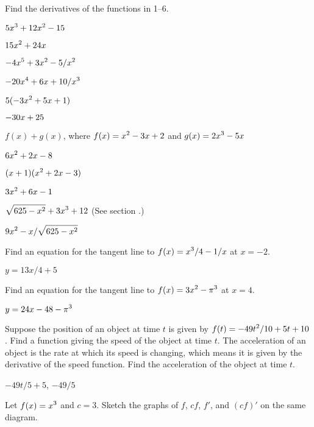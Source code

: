 \begin{exercises}

Find the derivatives of the functions in 1--6.

\exercise $\displaystyle 5x^3+12x^2-15$
\begin{answer} $\displaystyle 15x^2+24x$
\end{answer}

\exercise $\displaystyle -4x^5 + 3x^2 - 5/x^2$
\begin{answer} $\displaystyle -20x^4+6x+10/x^3$
\end{answer}

\exercise $\displaystyle 5(-3x^2 + 5x + 1)$
\begin{answer} $\displaystyle -30x+25$
\end{answer}

\exercise $f(x)+g(x)$, where $\displaystyle f(x)=x^2-3x+2$ and $\displaystyle g(x)=2x^3-5x$
\begin{answer} $\displaystyle 6x^2+2x-8$
\end{answer}

\exercise $\displaystyle (x+1)(x^2+2x-3)$
\begin{answer} $\displaystyle 3x^2+6x-1$
\end{answer}

\exercise $\displaystyle \sqrt{625-x^2}+3x^3+12$ (See section .)
\begin{answer} $\displaystyle 9x^2-x/\sqrt{625-x^2}$
\end{answer}

\exercise
 Find an equation for the tangent line to $\displaystyle f(x) = x^3/4 - 1/x$ at $x=-2$.
\begin{answer} $y=13x/4+5$
\end{answer}

\exercise Find an equation for 
the tangent line to $\displaystyle f(x)= 3x^2 - \pi ^3$ at $x= 4$.
\begin{answer} $\displaystyle y=24x-48-\pi^3$
\end{answer}

\exercise Suppose the position of an object at time $t$ is  given by
$\displaystyle f(t)=-49 t^2/10+5t+10$. Find a function giving the speed of the object
at time $t$. The acceleration of an object is the rate at which its
speed is changing, which means it is given by the derivative of the
speed function. Find the acceleration of the object at time $t$.
\begin{answer} $-49t/5+5$, $-49/5$
\end{answer}

\exercise Let $\displaystyle f(x) =x^3$ and $c= 3$. Sketch the graphs of $f$,
$cf$, $f'$, and $(cf)'$ on the same diagram.


\end{exercises}
